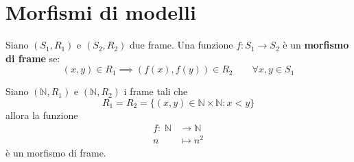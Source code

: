 \documentclass[../main.tex]{subfiles}
\begin{document}
\section{Morfismi di modelli}
\begin{definition}
    Siano $(S_1, R_1)$ e $(S_2, R_2)$ due frame. Una funzione $f : S_1 \rightarrow S_2$ è un \textbf{morfismo di frame} se:
    \begin{equation*}
        (x,y)\in R_1 \implies (f(x), f(y)) \in R_2 \qquad \forall x,y \in S_1
    \end{equation*}
\end{definition}
\begin{example}
    Siano $(\mathbb{N}, R_1)$ e $(\mathbb{N}, R_2)$ i frame tali che
    \begin{equation*}
        R_1 = R_2 = \{(x,y) \in \mathbb{N} \times \mathbb{N} : x < y\}
    \end{equation*}
    allora la funzione
    \begin{align*}
        f : \; \mathbb{N} & \rightarrow \mathbb{N} \\
        n                 & \mapsto n^2
    \end{align*}
    è un morfismo di frame.
\end{example}
\end{document}
